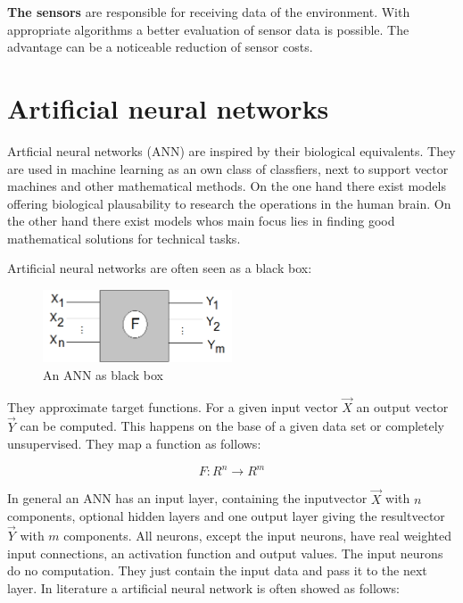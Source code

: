 \documentclass[10pt,a4paper,DIV=11]{scrreprt}
\begin{document}
\textbf{The sensors} are responsible for receiving data of the environment. With appropriate algorithms a better evaluation of sensor data is possible. The advantage can be a noticeable reduction of sensor costs.


\chapter{Artificial neural networks}
Artficial neural networks (ANN) are inspired by their biological equivalents.
They are used in machine learning as an own class of classfiers, next to support vector machines
and other mathematical methods. On the one hand there exist models offering biological plausability to research the
operations in the human brain. On the other hand there exist models whos main focus lies in finding good mathematical solutions for technical tasks.

Artificial neural networks are often seen as a black box: \\

\begin{center}
	\begin{figure}[H]
		\centering
		\includegraphics[width=0.5\textwidth,scale=1.0]{files/nn-bb.png}  
		\caption{An ANN as black box \cite{rojas}}
		\label{fig:neuron}
	\end{figure}
\end{center} 
They approximate target functions. For a given input vector $\vec{X}$ an output vector $\vec{Y}$ can be computed.
This happens on the base of a given data set or completely unsupervised.
They map a function as follows\cite{rojas}:

\begin{equation}
	F: R^n \to R^m 
\end{equation} 

In general an ANN has an input layer, containing the inputvector $\vec{X}$ with $n$ components, optional hidden layers and one output layer giving the resultvector $\vec{Y}$ with $m$ components.
All neurons, except the input neurons, have real weighted input connections, an activation function and output values. The input neurons do no computation. They just contain the input data and pass it to the next layer. In literature a artificial neural network is often showed as follows: \cite{rojas} \cite{rey}
\end{document}
